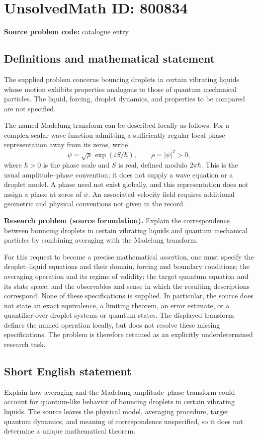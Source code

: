 \documentclass[11pt]{article}
\begin{document}
\section*{UnsolvedMath ID: 800834}
\textbf{Source problem code:} catalogue entry
\subsection{Definitions and mathematical statement}
The supplied problem concerns bouncing droplets in certain vibrating liquids whose motion exhibits properties analogous to those of quantum mechanical particles. The liquid, forcing, droplet dynamics, and properties to be compared are not specified.

The named Madelung transform can be described locally as follows. For a complex scalar wave function admitting a sufficiently regular local phase representation away from its zeros, write
\[
\psi=\sqrt{\rho}\,\exp(iS/\hbar),\qquad \rho=|\psi|^2>0,
\]
where \(\hbar>0\) is the phase scale and \(S\) is real, defined modulo \(2\pi\hbar\). This is the usual amplitude--phase convention; it does not supply a wave equation or a droplet model. A phase need not exist globally, and this representation does not assign a phase at zeros of \(\psi\). An associated velocity field requires additional geometric and physical conventions not given in the record.

\textbf{Research problem (source formulation).} Explain the correspondence between bouncing droplets in certain vibrating liquids and quantum mechanical particles by combining averaging with the Madelung transform.

For this request to become a precise mathematical assertion, one must specify the droplet--liquid equations and their domain, forcing and boundary conditions; the averaging operation and its regime of validity; the target quantum equation and its state space; and the observables and sense in which the resulting descriptions correspond. None of these specifications is supplied. In particular, the source does not state an exact equivalence, a limiting theorem, an error estimate, or a quantifier over droplet systems or quantum states. The displayed transform defines the named operation locally, but does not resolve these missing specifications. The problem is therefore retained as an explicitly underdetermined research task.
\subsection{Short English statement}
Explain how averaging and the Madelung amplitude--phase transform could account for quantum-like behavior of bouncing droplets in certain vibrating liquids. The source leaves the physical model, averaging procedure, target quantum dynamics, and meaning of correspondence unspecified, so it does not determine a unique mathematical theorem.
\end{document}
